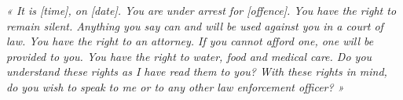 \vspace{7mm}

\begin{note}
\emph{« It is [time], on [date]. You are under arrest for [offence]. You have the right to remain silent. Anything you say can and will be used against you in a court of law. You have the right to an attorney. If you cannot afford one, one will be provided to you. You have the right to water, food and medical care. Do you understand these rights as I have read them to you? With these rights in mind, do you wish to speak to me or to any other law enforcement officer? »}
\end{note}

\clearpage

